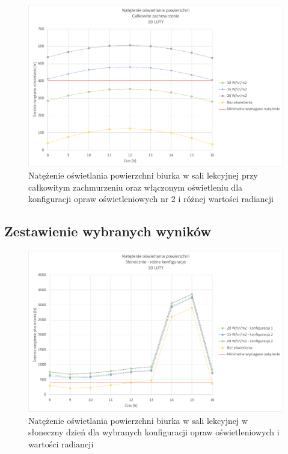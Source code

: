 \documentclass[a4paper,12pt]{article}
\begin{document}
	\begin{figure}[!ht]
		\centering
		\includegraphics[scale=0.8]{Wykresy/oswietlenie_2_calkowite_zachmurzenie.pdf}
		\caption{Natężenie oświetlania powierzchni biurka w sali lekcyjnej przy całkowitym zachmurzeniu  oraz włączonym oświetleniu dla konfiguracji opraw oświetleniowych nr 2 i różnej wartości radiancji}
		\label{oswietlenie_2_calkowite_zachmurzenie}
	\end{figure}

	\newpage
	\subsection{Zestawienie wybranych wyników}
	\label{sec:zestawienie_wybranych_wynikow}
	
	\begin{figure}[!ht]
		\centering
		\includegraphics[scale=0.8]{Wykresy/oswietlenie_slonecznie_rozne_konfiguracje.pdf}
		\caption{Natężenie oświetlania powierzchni biurka w sali lekcyjnej w słoneczny dzień dla wybranych konfiguracji opraw oświetleniowych i wartości radiancji}
		\label{oswietlenie_slonecznie_rozne_konfiguracje}
	\end{figure}
\end{document}
